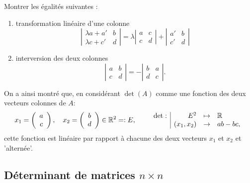 \begin{exercise*} Montrer les égalités suivantes : 
  \begin{enumerate}
    \item transformation linéaire d'une colonne
    $$
    \left| \begin{array}{cc} \lambda a + a' & b \\ \lambda c + c' & d \end{array} \right|
    =
    \lambda \left| \begin{array}{cc} a & c \\ c & d \end{array} \right|
    +
    \left| \begin{array}{cc} a' & b \\ c ' & d \end{array} \right|
    $$
    \item interversion des deux colonnes
    $$
    \left| \begin{array}{cc} a & b \\ c & d \end{array} \right|
    =
    - \left| \begin{array}{cc} b & a \\ d & c \end{array} \right|.
    $$
  \end{enumerate}
\end{exercise*}


\remark On a ainsi montré que, en considérant $\det(A)$ comme une fonction des deux vecteurs colonnes de $A$:
$$
x_1 = \left(\begin{array}{c}a \\c \end{array} \right), \quad
x_2 = \left(\begin{array}{c}b \\d \end{array} \right) \in \mathbb{R}^2 =: E, \qquad
\begin{array}{r|rcl}
  \det : & E^2 & \mapsto & \mathbb{R} \\
  & (x_1, x_2) & \rightarrow & ab - bc,
\end{array}
$$
cette fonction est linéaire par rapport à chacune des deux vecteurs $x_1$ et $x_2$ et 'alternée'.

\subsection{Déterminant de matrices $n \times n$} 

